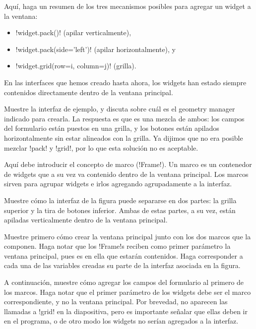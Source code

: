 \documentclass[10pt]{article}
\begin{document}
  Aquí,
  haga un resumen de los tres mecanismos posibles
  para agregar un widget a la ventana:
  \begin{itemize}
    \item \li!widget.pack()! (apilar verticalmente),
    \item \li!widget.pack(side='left')! (apilar horizontalmente), y
    \item \li!widget.grid(row=i, column=j)! (grilla).
  \end{itemize}


  En las interfaces que hemos creado hasta ahora,
  los widgets han estado siempre contenidos directamente
  dentro de la ventana principal.

  Muestre la interfaz de ejemplo,
  y discuta sobre cuál es el geometry manager indicado para crearla.
  La respuesta es que es una mezcla de ambos:
  los campos del formulario están puestos en una grilla,
  y los botones están apilados horizontalmente
  sin estar alineados con la grilla.
  Ya dijimos que no era posible mezclar \li!pack! y \li!grid!,
  por lo que esta solución no es aceptable.

  Aquí debe introducir el concepto de marco (\li!Frame!).
  Un marco es un contenedor de widgets
  que a su vez va contenido dentro de la ventana principal.
  Los marcos sirven para agrupar widgets
  e irlos agregando agrupadamente a la interfaz.

  Muestre cómo la interfaz de la figura
  puede separarse en dos partes:
  la grilla superior
  y la tira de botones inferior.
  Ambas de estas partes, a su vez,
  están apiladas verticalmente dentro de la ventana principal.


  Muestre primero cómo crear la ventana principal
  junto con los dos marcos que la componen.
  Haga notar que los \li!Frame!s reciben como primer parámetro
  la ventana principal, pues es en ella que estarán contenidos.
  Haga corresponder a cada una de las variables creadas
  su parte de la interfaz asociada en la figura.


  A continuación,
  muestre cómo agregar los campos del formulario
  al primero de los marcos.
  Haga notar que el primer parámetro de los widgets
  debe ser el marco correspondiente,
  y no la ventana principal.
  Por brevedad,
  no aparecen las llamadas a \li!grid! en la diapositiva,
  pero es importante señalar que ellas deben ir en el programa,
  o de otro modo los widgets no serían agregados a la interfaz.
\end{document}
